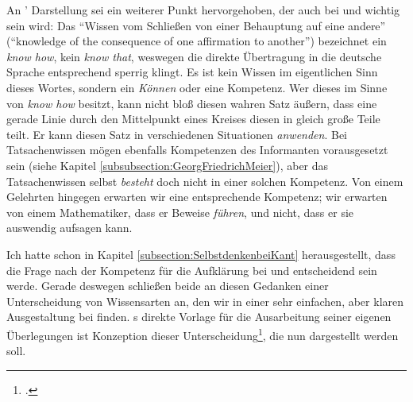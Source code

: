 An ' Darstellung sei ein weiterer Punkt
hervorgehoben, der auch bei
 und
 wichtig sein wird: Das \enquote{Wissen vom Schließen von
einer Behauptung auf eine andere} (\enquote{knowledge of the consequence of one
affirmation to another}) bezeichnet ein \emph{know how}, kein \emph{know that},
weswegen die direkte Übertragung in die deutsche Sprache entsprechend sperrig
klingt. Es ist kein Wissen im eigentlichen Sinn dieses Wortes, sondern ein
\emph{Können} oder eine Kompetenz. Wer dieses  im Sinne von
\emph{know how} besitzt, kann nicht bloß diesen wahren Satz äußern, dass eine
gerade Linie durch den Mittelpunkt eines Kreises diesen in gleich große Teile
teilt. Er kann diesen Satz in verschiedenen Situationen \emph{anwenden}. Bei Tatsachenwissen mögen
ebenfalls Kompetenzen des Informanten vorausgesetzt sein (siehe Kapitel
\ref{subsubsection:GeorgFriedrichMeier}), aber das Tatsachenwissen selbst
\emph{besteht} doch nicht in einer solchen Kompetenz. Von einem Gelehrten
hingegen erwarten wir eine entsprechende Kompetenz; wir erwarten von einem
Mathematiker, dass er Beweise \emph{führen}, und nicht, dass er sie auswendig
aufsagen kann.

Ich hatte schon in Kapitel \ref{subsection:SelbstdenkenbeiKant} herausgestellt,
dass die Frage nach der Kompetenz für die Aufklärung bei
 und
 entscheidend sein werde. Gerade deswegen schließen beide
an diesen Gedanken einer Unterscheidung von Wissensarten an, den wir in einer
sehr einfachen, aber klaren Ausgestaltung bei 
finden. s direkte Vorlage für die Ausarbeitung seiner
eigenen Überlegungen ist
 Konzeption
dieser
Unterscheidung\footcite[vgl.][\pno~12\,f.]{Albrecht:KantsKritikderhistorischenErkenntnis--einBekenntniszuWolff?1982},
die nun dargestellt werden soll.

